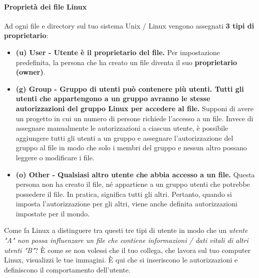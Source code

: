 \paragraph{Proprietà dei file Linux}
Ad ogni file e directory sul tuo sistema Unix / Linux vengono assegnati \textbf{3 tipi di proprietario}:
\begin{itemize}
    \item \textbf{(u) User - Utente è il proprietario del file. } Per impostazione predefinita, la persona che ha creato un file diventa il suo\textbf{ proprietario (owner)}.
    \item \textbf{(g) Group - Gruppo di utenti può contenere più utenti. Tutti gli utenti che appartengono a un gruppo avranno le stesse autorizzazioni del gruppo Linux per accedere al file.} Supponi di avere un progetto in cui un numero di persone richiede l'accesso a un file. Invece di assegnare manualmente le autorizzazioni a ciascun utente, è possibile aggiungere tutti gli utenti a un gruppo e assegnare l'autorizzazione del gruppo al file in modo che solo i membri del gruppo e nessun altro possano leggere o modificare i file.
    \item \textbf{(o) Other - Qualsiasi altro utente che abbia accesso a un file.} Questa persona non ha creato il file, né appartiene a un gruppo utenti che potrebbe possedere il file. In pratica, significa tutti gli altri. Pertanto, quando si imposta l'autorizzazione per gli altri, viene anche definita autorizzazioni impostate per il mondo.
\end{itemize}
Come fa Linux a distinguere tra questi tre tipi di utente in modo che un \textit{utente "A" non possa influenzare un file che contiene informazioni / dati vitali di altri utenti "B"}? È come se non volessi che il tuo collega, che lavora sul tuo computer Linux, visualizzi le tue immagini. È qui che si inseriscono le autorizzazioni e definiscono il comportamento dell'utente.

